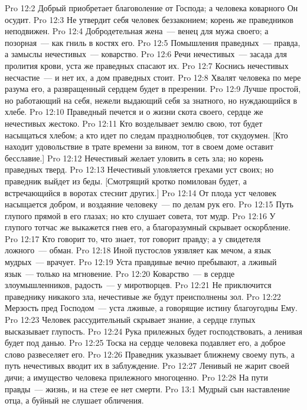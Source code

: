 \vs Pro 12:2 Добрый приобретает благоволение от Господа; а человека коварного Он осудит.
\vs Pro 12:3 Не утвердит себя человек беззаконием; корень же праведников неподвижен.
\vs Pro 12:4 Добродетельная жена~--- венец для мужа своего; а позорная~--- как гниль в костях его.
\vs Pro 12:5 Помышления праведных~--- правда, а замыслы нечестивых~--- коварство.
\vs Pro 12:6 Речи нечестивых~--- засада для пролития крови, уста же праведных спасают их.
\vs Pro 12:7 Коснись нечестивых несчастие~--- и нет их, а дом праведных стоит.
\vs Pro 12:8 Хвалят человека по мере разума его, а развращенный сердцем будет в презрении.
\vs Pro 12:9 Лучше простой, но работающий на себя, нежели выдающий себя за знатного, но нуждающийся в хлебе.
\vs Pro 12:10 Праведный печется и о жизни скота своего, сердце же нечестивых жестоко.
\vs Pro 12:11 Кто возделывает землю свою, тот будет насыщаться хлебом; а кто идет по следам празднолюбцев, тот скудоумен. [Кто находит удовольствие в трате времени за вином, тот в своем доме оставит бесславие.]
\vs Pro 12:12 Нечестивый желает уловить в сеть зла; но корень праведных тверд.
\vs Pro 12:13 Нечестивый уловляется грехами уст своих; но праведник выйдет из беды. [Смотрящий кротко помилован будет, а встречающийся в воротах стеснит других.]
\vs Pro 12:14 От плода уст  человек насыщается добром, и воздаяние человеку~--- по делам рук его.
\vs Pro 12:15 Путь глупого прямой в его глазах; но кто слушает совета, тот мудр.
\vs Pro 12:16 У глупого тотчас же выкажется гнев его, а благоразумный скрывает оскорбление.
\vs Pro 12:17 Кто говорит то, что знает, тот говорит правду; а у свидетеля ложного~--- обман.
\vs Pro 12:18 Иной пустослов уязвляет как мечом, а язык мудрых~--- врачует.
\vs Pro 12:19 Уста правдивые вечно пребывают, а лживый язык~--- только на мгновение.
\vs Pro 12:20 Коварство~--- в сердце злоумышленников, радость~--- у миротворцев.
\vs Pro 12:21 Не приключится праведнику никакого зла, нечестивые же будут преисполнены зол.
\vs Pro 12:22 Мерзость пред Господом~--- уста лживые, а говорящие истину благоугодны Ему.
\vs Pro 12:23 Человек рассудительный скрывает знание, а сердце глупых высказывает глупость.
\vs Pro 12:24 Рука прилежных будет господствовать, а ленивая будет под данью.
\vs Pro 12:25 Тоска на сердце человека подавляет его, а доброе слово развеселяет его.
\vs Pro 12:26 Праведник указывает ближнему своему путь, а путь нечестивых вводит их в заблуждение.
\vs Pro 12:27 Ленивый не жарит своей дичи; а имущество человека прилежного многоценно.
\vs Pro 12:28 На пути правды~--- жизнь, и на стезе ее нет смерти.
\vs Pro 13:1 Мудрый сын  наставление отца, а буйный не слушает обличения.

